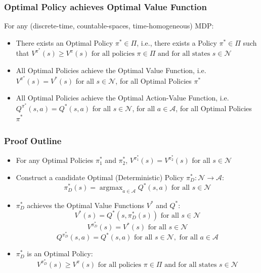 \documentclass[handout]{beamer}
\DeclareMathOperator*{\argmax}{argmax}
\begin{document}
\begin{frame}
\frametitle{Optimal Policy achieves Optimal Value Function}
\begin{theorem}
For any (discrete-time, countable-spaces, time-homogeneous) MDP:
\pause
\begin{itemize}[<+->]
\item There exists an Optimal Policy $\pi^* \in \Pi$, i.e., there exists a Policy $\pi^* \in \Pi$ such that $V^{\pi^*}(s) \geq V^{\pi}(s) \text{ for all policies  } \pi \in \Pi \mbox{ and for all states } s \in \mathcal{N}$
\item All Optimal Policies achieve the Optimal Value Function, i.e. $V^{\pi^*}(s) = V^*(s)$ for all $s \in \mathcal{N}$, for all Optimal Policies $\pi^*$
\item All Optimal Policies achieve the Optimal Action-Value Function, i.e. $Q^{\pi^*}(s,a) = Q^*(s,a)$ for all $s \in \mathcal{N}$, for all $a \in \mathcal{A}$, for all Optimal Policies $\pi^*$
\end{itemize}
\label{th:optimal-policy-achieves-optimal-value-function}
\end{theorem}
\end{frame}

\begin{frame}
\frametitle{Proof Outline}
\pause
\begin{itemize}[<+->]
\item For any Optimal Policies $\pi_1^*$ and $\pi_2^*$, $V^{\pi_1^*}(s) = V^{\pi_2^*}(s)$ for all $s \in \mathcal{N}$
\item Construct a candidate Optimal (Deterministic) Policy $\pi_D^* : \mathcal{N} \rightarrow \mathcal{A}$:
 $$\pi_D^*(s) = \argmax_{a \in \mathcal{A}} Q^*(s,a) \text{ for all } s \in \mathcal{N}$$
 \item $\pi_D^*$ achieves the Optimal Value Functions $V^*$ and $Q^*$:
 $$V^*(s) = Q^*(s,\pi_D^*(s)) \text{ for all } s \in \mathcal{N}$$
 $$V^{\pi_D^*}(s) = V^*(s) \text{ for all } s \in \mathcal{N}$$
$$Q^{\pi_D^*}(s,a) = Q^*(s,a) \text{ for all } s \in \mathcal{N}, \text{ for all } a \in \mathcal{A}$$
\item $\pi_D^*$ is an Optimal Policy:
$$V^{\pi_D^*}(s) \geq V^{\pi}(s) \text{ for all policies  } \pi \in \Pi \text{ and for all states } s \in \mathcal{N}$$
\end{itemize}
\end{frame}
\end{document}
